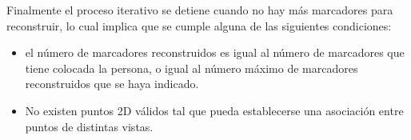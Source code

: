 Finalmente el proceso iterativo se detiene cuando no hay más marcadores para reconstruir, lo cual implica que se cumple alguna de las siguientes condiciones:
\begin{itemize}
\item el número de marcadores reconstruidos es igual al número de marcadores que tiene colocada la persona, o igual al número máximo de marcadores  reconstruidos que se haya indicado.

\item No existen puntos 2D válidos tal que pueda establecerse una asociación entre puntos de distintas vistas.
\end{itemize}





